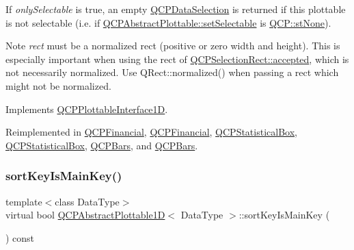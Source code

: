 If {\itshape only\+Selectable} is true, an empty \hyperlink{class_q_c_p_data_selection}{Q\+C\+P\+Data\+Selection} is returned if this plottable is not selectable (i.\+e. if \hyperlink{class_q_c_p_abstract_plottable_ac238d6e910f976f1f30d41c2bca44ac3}{Q\+C\+P\+Abstract\+Plottable\+::set\+Selectable} is \hyperlink{namespace_q_c_p_ac6cb9db26a564b27feda362a438db038a2cb7996ccc6c39b9e6d20f2e46bf3f57}{Q\+C\+P\+::st\+None}).

\begin{DoxyNote}{Note}
{\itshape rect} must be a normalized rect (positive or zero width and height). This is especially important when using the rect of \hyperlink{class_q_c_p_selection_rect_a15a43542e1f7b953a44c260b419e6d2c}{Q\+C\+P\+Selection\+Rect\+::accepted}, which is not necessarily normalized. Use {\ttfamily Q\+Rect\+::normalized()} when passing a rect which might not be normalized. 
\end{DoxyNote}


Implements \hyperlink{class_q_c_p_plottable_interface1_d_a67093e4ccf490ff5f7750640941ff34c}{Q\+C\+P\+Plottable\+Interface1D}.



Reimplemented in \hyperlink{class_q_c_p_financial_a3c5beb1ab028a1dba845fc9dcffc7cf4}{Q\+C\+P\+Financial}, \hyperlink{class_q_c_p_financial_a2d7c9beec376fed78a6091a17f59eb1e}{Q\+C\+P\+Financial}, \hyperlink{class_q_c_p_statistical_box_a42febad6ad5e924a151434cc434b4ffc}{Q\+C\+P\+Statistical\+Box}, \hyperlink{class_q_c_p_statistical_box_a7047863d59673d8d049bf26cfdd9912c}{Q\+C\+P\+Statistical\+Box}, \hyperlink{class_q_c_p_bars_ab03bb6125c3e983b89d694f75ce6b3d5}{Q\+C\+P\+Bars}, and \hyperlink{class_q_c_p_bars_a429d8c3c39972bf6069329175bb85c34}{Q\+C\+P\+Bars}.

\mbox{\label{class_q_c_p_abstract_plottable1_d_aa4a61e7fc79f1b71ff660db53c92efd2}} 
\subsubsection{\texorpdfstring{sort\+Key\+Is\+Main\+Key()}{sortKeyIsMainKey()}\hspace{0.1cm}{\footnotesize\ttfamily [1/2]}}
{\footnotesize\ttfamily template$<$class Data\+Type$>$ \\
virtual bool \hyperlink{class_q_c_p_abstract_plottable1_d}{Q\+C\+P\+Abstract\+Plottable1D}$<$ Data\+Type $>$\+::sort\+Key\+Is\+Main\+Key (\begin{DoxyParamCaption}{ }\end{DoxyParamCaption}) const\hspace{0.3cm}{\ttfamily [virtual]}}

